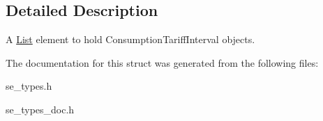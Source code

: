 \subsection{Detailed Description}
A \hyperlink{structList}{List} element to hold Consumption\+Tariff\+Interval objects. 

The documentation for this struct was generated from the following files\+:\begin{DoxyCompactItemize}
\item 
se\+\_\+types.\+h\item 
se\+\_\+types\+\_\+doc.\+h\end{DoxyCompactItemize}
